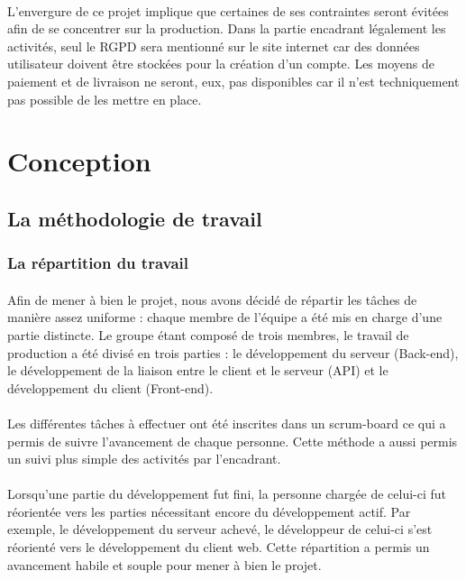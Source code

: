 \documentclass[a4paper, 12pt]{article}
\begin{document}
\paragraph{}L’envergure de ce projet implique que certaines de ses contraintes seront évitées afin de se concentrer sur la production. Dans la partie encadrant légalement les activités, seul le RGPD sera mentionné sur le site internet car des données utilisateur doivent être stockées pour la création d’un compte. Les moyens de paiement et de livraison ne seront, eux, pas disponibles car il n’est techniquement pas possible de les mettre en place.

\newpage
\section{Conception}
\subsection{La méthodologie de travail}
\subsubsection{La répartition du travail}
\paragraph{}Afin de mener à bien le projet, nous avons décidé de répartir les tâches de manière assez uniforme : chaque membre de l’équipe a été mis en charge d’une partie distincte. Le groupe étant composé de trois membres, le travail de production a été divisé en trois parties : le développement du serveur (Back-end), le développement de la liaison entre le client et le serveur (API) et le développement du client (Front-end).
\paragraph{}Les différentes tâches à effectuer ont été inscrites dans un scrum-board ce qui a permis de suivre l’avancement de chaque personne. Cette méthode a aussi permis un suivi plus simple des activités par l’encadrant.
\paragraph{}Lorsqu’une partie du développement fut fini, la personne chargée de celui-ci fut réorientée vers les parties nécessitant encore du développement actif. Par exemple, le développement du serveur achevé, le développeur de celui-ci s’est réorienté vers le développement du client web.
Cette répartition a permis un avancement habile et souple pour mener à bien le projet.
\end{document}

